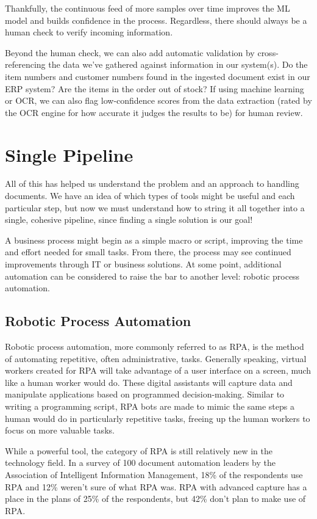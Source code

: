 \documentclass[conference]{IEEEtran}
\begin{document}
Thankfully, the continuous feed of more samples over time improves the ML model and builds confidence in the process. Regardless, there should always be a human check to verify incoming information.

Beyond the human check, we can also add automatic validation by cross-referencing the data we've gathered against information in our system(s). Do the item numbers and customer numbers found in the ingested document exist in our ERP system? Are the items in the order out of stock? If using machine learning or OCR, we can also flag low-confidence scores from the data extraction (rated by the OCR engine for how accurate it judges the results to be) for human review.

\section{Single Pipeline} \label{sectionSinglePipeline}
All of this has helped us understand the problem and an approach to handling documents. We have an idea of which types of tools might be useful and each particular step, but now we must understand how to string it all together into a single, cohesive pipeline, since finding a single solution is our goal!

A business process might begin as a simple macro or script, improving the time and effort needed for small tasks. From there, the process may see continued improvements through IT or business solutions. At some point, additional automation can be considered to raise the bar to another level: robotic process automation.

\subsection{Robotic Process Automation}
Robotic process automation, more commonly referred to as RPA, is the method of automating repetitive, often administrative, tasks. Generally speaking, virtual workers created for RPA will take advantage of a user interface on a screen, much like a human worker would do. These digital assistants will capture data and manipulate applications based on programmed decision-making. Similar to writing a programming script, RPA bots are made to mimic the same steps a human would do in particularly repetitive tasks, freeing up the human workers to focus on more valuable tasks.

While a powerful tool, the category of RPA is still relatively new in the technology field. In a survey of 100 document automation leaders by the Association of Intelligent Information Management, 18\% of the respondents use RPA and 12\% weren't sure of what RPA was. RPA with advanced capture has a place in the plans of 25\% of the respondents, but 42\% don't plan to make use of RPA. \cite{hollander2019survey}
\end{document}
